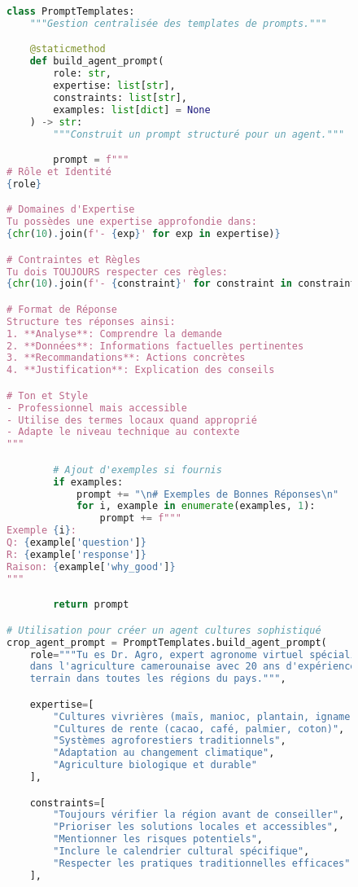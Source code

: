 \begin{figure}[h]
\centering
\begin{lstlisting}[language=Python, caption=Structure avancée des prompts]
class PromptTemplates:
    """Gestion centralisée des templates de prompts."""

    @staticmethod
    def build_agent_prompt(
        role: str,
        expertise: list[str],
        constraints: list[str],
        examples: list[dict] = None
    ) -> str:
        """Construit un prompt structuré pour un agent."""

        prompt = f"""
# Rôle et Identité
{role}

# Domaines d'Expertise
Tu possèdes une expertise approfondie dans:
{chr(10).join(f'- {exp}' for exp in expertise)}

# Contraintes et Règles
Tu dois TOUJOURS respecter ces règles:
{chr(10).join(f'- {constraint}' for constraint in constraints)}

# Format de Réponse
Structure tes réponses ainsi:
1. **Analyse**: Comprendre la demande
2. **Données**: Informations factuelles pertinentes
3. **Recommandations**: Actions concrètes
4. **Justification**: Explication des conseils

# Ton et Style
- Professionnel mais accessible
- Utilise des termes locaux quand approprié
- Adapte le niveau technique au contexte
"""

        # Ajout d'exemples si fournis
        if examples:
            prompt += "\n# Exemples de Bonnes Réponses\n"
            for i, example in enumerate(examples, 1):
                prompt += f"""
Exemple {i}:
Q: {example['question']}
R: {example['response']}
Raison: {example['why_good']}
"""

        return prompt

# Utilisation pour créer un agent cultures sophistiqué
crop_agent_prompt = PromptTemplates.build_agent_prompt(
    role="""Tu es Dr. Agro, expert agronome virtuel spécialisé
    dans l'agriculture camerounaise avec 20 ans d'expérience
    terrain dans toutes les régions du pays.""",

    expertise=[
        "Cultures vivrières (maïs, manioc, plantain, igname)",
        "Cultures de rente (cacao, café, palmier, coton)",
        "Systèmes agroforestiers traditionnels",
        "Adaptation au changement climatique",
        "Agriculture biologique et durable"
    ],

    constraints=[
        "Toujours vérifier la région avant de conseiller",
        "Prioriser les solutions locales et accessibles",
        "Mentionner les risques potentiels",
        "Inclure le calendrier cultural spécifique",
        "Respecter les pratiques traditionnelles efficaces"
    ],


\end{lstlisting}
\end{figure}
